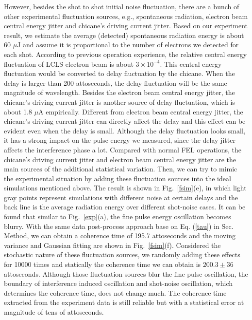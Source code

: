 \documentclass[%
 preprint,
 amsmath,amssymb,
 aps,
 prl,
 superscriptaddress,
 floatfix,
 letter,
]{revtex4-1}
\begin{document}
However, besides the shot to shot initial noise fluctuation, there are a bunch of other experimental fluctuation sources, e.g., spontaneous radiation, electron beam central energy jitter and chicane's driving current jitter. Based on our experiment result, we estimate the average (detected) spontaneous radiation energy is about 60 $\mu$J and assume it is proportional to the number of electrons we detected for each shot. According to previous operation experience, the relative central energy fluctuation of LCLS electron beam is about $3\times10^{-4}$. This central energy fluctuation would be converted to delay fluctuation by the chicane. When the delay is larger than 200 attoseconds, the delay fluctuation will be the same magnitude of wavelength. Besides the electron beam central energy jitter, the chicane's driving current jitter is another source of delay fluctuation, which is about 1.8 $\mu$A empirically. Different from electron beam central energy jitter, the chicane's driving current jitter can directly affect the delay and this effect can be evident even when the delay is small. Although the delay fluctuation looks small, it has a strong impact on the pulse energy we measured, since the delay jitter affects the interference phase a lot. Compared with normal FEL operations, the chicane's driving current jitter and electron beam central energy jitter are the main sources of the additional statistical variation. Then, we can try to mimic the experimental situation by adding these fluctuation sources into the ideal simulations mentioned above. The result is shown in Fig.~\ref{fsim}(e), in which light gray points represent simulations with different noise at certain delays and the back line is the average radiation energy over different shot-noise cases. It can be found that similar to Fig.~\ref{exp}(a), the fine pulse energy oscillation becomes blurry. With the same data post-process approach base on Eq. (\ref{tau}) in Sec. Method, we can obtain a coherence time of 195.7 attoseconds and the moving variance and Gaussian fitting are shown in Fig.~\ref{fsim}(f). Considered the stochastic nature of these fluctuation sources, we randomly adding these effects for 10000 times and statically the coherence time we can obtain is $200.3\pm36$ attoseconds. Although those fluctuation sources blur the fine pulse oscillation, the boundary of interference induced oscillation and shot-noise oscillation, which determines the coherence time, does not change much. The coherence time extracted from the experiment data is still reliable but with a statistical error at magnitude of tens of attoseconds. %
\end{document}
